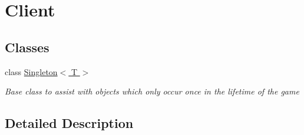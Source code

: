 \hypertarget{group__client}{\section{Client}
\label{group__client}
}
\subsection*{Classes}
\begin{DoxyCompactItemize}
\item 
class \hyperlink{class_singleton_3_01_t_01_4}{Singleton$<$ T $>$}
\begin{DoxyCompactList}\small\item\em Base class to assist with objects which only occur once in the lifetime of the game \end{DoxyCompactList}\end{DoxyCompactItemize}


\subsection{Detailed Description}
